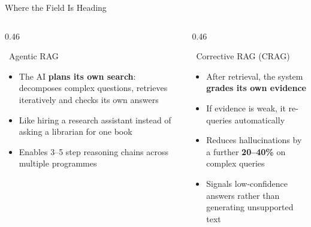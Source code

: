 \documentclass[aspectratio=169,11pt]{beamer}
\begin{document}
\begin{frame}{Where the Field Is Heading}
  \vspace{0.2cm}
  \begin{columns}[t]
    \begin{column}{0.46\textwidth}
      \begin{block}{\faRobot\ Agentic RAG}
        \begin{itemize}\setlength\itemsep{6pt}
          \item The AI \textbf{plans its own search}:
                decomposes complex questions, retrieves
                iteratively and checks its own answers
          \item Like hiring a research assistant instead
                of asking a librarian for one book
          \item Enables 3--5 step reasoning chains across
                multiple programmes
        \end{itemize}
      \end{block}
    \end{column}
    \begin{column}{0.46\textwidth}
      \begin{block}{\faSync\ Corrective RAG (CRAG)}
        \begin{itemize}\setlength\itemsep{6pt}
          \item After retrieval, the system
                \textbf{grades its own evidence}
          \item If evidence is weak, it re-queries
                automatically
          \item Reduces hallucinations by a further
                \textbf{20--40\%} on complex queries
          \item Signals low-confidence answers rather
                than generating unsupported text
        \end{itemize}
      \end{block}
    \end{column}
  \end{columns}
\end{frame}
\end{document}
